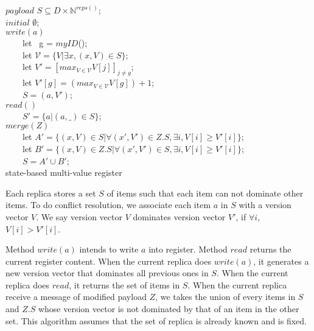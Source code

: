 \renewcommand{\algorithmcfname}{CRDT Implementation}
\noindent
\noindent\begin{algorithm}[H]
$\mathit{payload}$ $S \subseteq D \times \mathbb{N}^{\mathit{reps}()}$; \\ 
$\mathit{initial}$ $\emptyset$; \\ 

$\mathit{write}(a)$ \\
\ \ \ \ let \ g = $\mathit{myID}$(); \\ 
\ \ \ \ let $\mathcal{V} = \{ V \vert \exists x, (x,V) \in S \}$; \\ 
\ \ \ \ let $V' = [ \mathit{max}_{V \in \mathcal{V}} V[j] ]_{j \neq g}$; \\ 
\ \ \ \ let $V'[g] = (\mathit{max}_{V \in \mathcal{V}} V[g]) + 1$; \\ 
\ \ \ \ $S = (a,V')$; \\ 

$\mathit{read}()$ \\
\ \ \ \ \KwRet $S' = \{ a \vert (a,\_) \in S \}$; \\ 

$\mathit{merge}(Z)$ \\
\ \ \ \ let $A' = \{ (x,V) \in S \vert \forall (x',V') \in Z.S, \exists i, V[i] \geq V'[i] \}$; \\ 
\ \ \ \ let $B' = \{ (x,V) \in Z.S \vert \forall (x',V') \in S, \exists i, V[i] \geq V'[i] \}$; \\ 
\ \ \ \ $S = A' \cup B'$; \\ 
\caption{state-based multi-value register}
\label{Method1}
\end{algorithm} 

Each replica stores a set $S$ of items such that each item can not dominate other items. To do conflict resolution, we associate each item $a$ in $S$ with a version vector $V$. We say version vector $V$ dominates version vector $V'$, if $\forall i$, $V[i] > V'[i]$.

Method $\mathit{write}(a)$ intends to write $a$ into register. Method $\mathit{read}$ returns the current register content. When the current replica does $\mathit{write}(a)$, it generates a new version vector that dominates all previous ones in $S$. When the current replica does $\mathit{read}$, it returns the set of items in $S$. When the current replica receive a message of modified payload $Z$, we takes the union of every items in $S$ and $Z.S$ whose version vector is not dominated by that of an item in the other set. This algorithm assumes that the set of replica is already known and is fixed.


